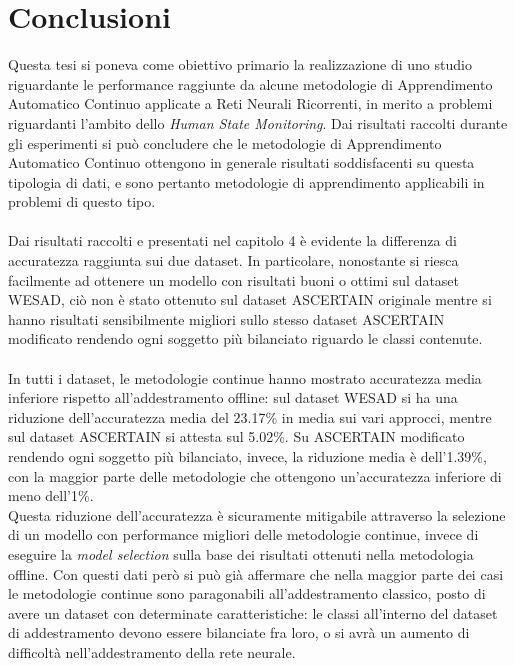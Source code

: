 \chapter{Conclusioni}
Questa tesi si poneva come obiettivo primario la realizzazione di uno studio riguardante le performance raggiunte da alcune metodologie di Apprendimento Automatico Continuo applicate a Reti Neurali Ricorrenti, in merito a problemi riguardanti l'ambito dello \textit{Human State Monitoring}. Dai risultati raccolti durante gli esperimenti si può concludere che le metodologie di Apprendimento Automatico Continuo ottengono in generale risultati soddisfacenti su questa tipologia di dati, e sono pertanto metodologie di apprendimento applicabili in problemi di questo tipo.\\\\
Dai risultati raccolti e presentati nel capitolo 4 è evidente la differenza di accuratezza raggiunta sui due dataset. In particolare, nonostante si riesca facilmente ad ottenere un modello con risultati buoni o ottimi sul dataset WESAD, ciò non è stato ottenuto sul dataset ASCERTAIN originale mentre si hanno risultati sensibilmente migliori sullo stesso dataset ASCERTAIN modificato rendendo ogni soggetto più bilanciato riguardo le classi contenute.\\\\
In tutti i dataset, le metodologie continue hanno mostrato accuratezza media inferiore rispetto all'addestramento offline: sul dataset WESAD si ha una riduzione dell'accuratezza media del 23.17\% in media sui vari approcci, mentre sul dataset ASCERTAIN si attesta sul 5.02\%. Su ASCERTAIN modificato rendendo ogni soggetto più bilanciato, invece, la riduzione media è dell'1.39\%, con la maggior parte delle metodologie che ottengono un'accuratezza inferiore di meno dell'1\%.\\
Questa riduzione dell'accuratezza è sicuramente mitigabile attraverso la selezione di un modello con performance migliori delle metodologie continue, invece di eseguire la \textit{model selection} sulla base dei risultati ottenuti nella metodologia offline. Con questi dati però si può già affermare che nella maggior parte dei casi le metodologie continue sono paragonabili all'addestramento classico, posto di avere un dataset con determinate caratteristiche: le classi all'interno del dataset di addestramento devono essere bilanciate fra loro, o si avrà un aumento di difficoltà nell'addestramento della rete neurale.\\\\
\pagebreak

